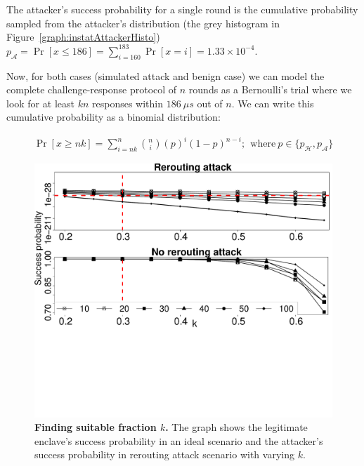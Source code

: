 The attacker's success probability for a single round is the cumulative probability sampled from the attacker's distribution (the grey histogram in Figure~\ref{graph:instatAttackerHisto}) $p_\mathcal{A} = \Pr[x \leq 186] = \sum_{i=160}^{183}\Pr[x=i] = 1.33 \times 10^{-4}$.


Now, for both cases (simulated attack and benign case) we can model the complete challenge-response protocol of $n$ rounds as a Bernoulli's trial where we look for at least $kn$ responses within $186\ \mu s$ out of $n$. We can write this cumulative probability as a binomial distribution:
%

\begin{align*}
    \Pr[x \geq nk] = \sum_{i=nk}^n\binom{n}{i} (p)^{i}(1-p)^{n-i};~~\text{where}~ p \in \{p_\mathcal{H}, p_\mathcal{A}\}
\end{align*}

\begin{figure}[t]
  \centering
    \includegraphics[trim={0 10cm 0 0}, clip, width=\linewidth]{chapters/ProximiTEE/data/fx3_data/round_comp_new.pdf}
    \caption[Finding suitable fraction $k$]{\textbf{Finding suitable fraction $k$.} The graph shows the legitimate enclave's success probability in an ideal scenario and the attacker's success probability in rerouting attack scenario with varying $k$.}
    \label{graph:roundSuccess}
\end{figure}



